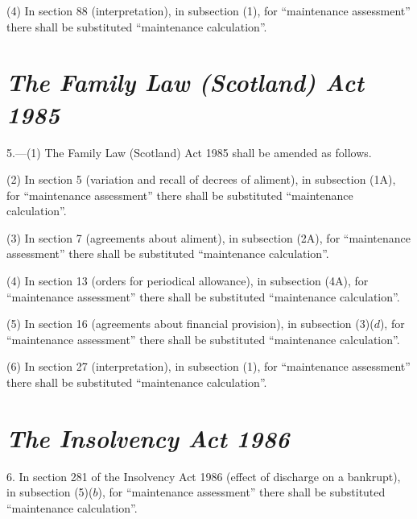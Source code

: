 \documentclass[12pt,a4paper]{article}
\begin{document}
(4) In section 88 (interpretation), in subsection (1), for “maintenance assessment” there shall be substituted “maintenance calculation”.


\section*{\itshape The Family Law (Scotland) Act 1985}

5.---(1) The Family Law (Scotland) Act 1985 shall be amended as follows.

(2) In section 5 (variation and recall of decrees of aliment), in subsection (1A), for “maintenance assessment” there shall be substituted “maintenance calculation”.

(3) In section 7 (agreements about aliment), in subsection (2A), for “maintenance assessment” there shall be substituted “maintenance calculation”.

(4) In section 13 (orders for periodical allowance), in subsection (4A), for “maintenance assessment” there shall be substituted “maintenance calculation”.

(5) In section 16 (agreements about financial provision), in subsection (3)($d$), for “maintenance assessment” there shall be substituted “maintenance calculation”.

(6) In section 27 (interpretation), in subsection (1), for “maintenance assessment” there shall be substituted “maintenance calculation”.


\section*{\itshape The Insolvency Act 1986}

6. In section 281 of the Insolvency Act 1986 (effect of discharge on a bankrupt), in subsection (5)($b$), for “maintenance assessment” there shall be substituted “maintenance calculation”.

\end{document}
